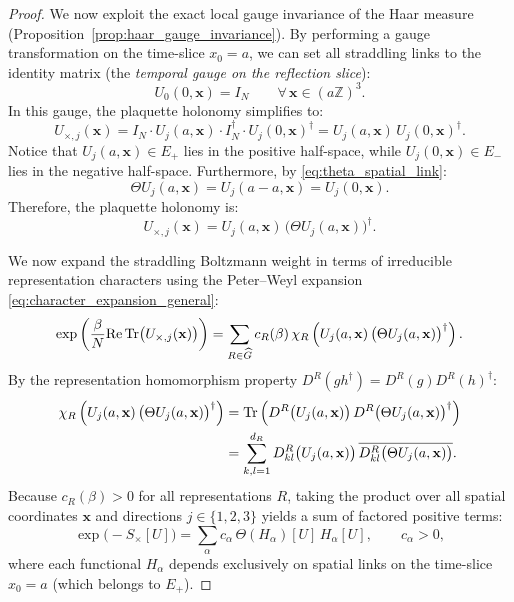 \begin{proof}
We now exploit the exact local gauge invariance of the Haar measure (Proposition~\ref{prop:haar_gauge_invariance}). By performing a gauge transformation on the time-slice $x_0 = a$, we can set all straddling links to the identity matrix (the \emph{temporal gauge on the reflection slice}):
\begin{equation}
U_0(0, \mathbf{x}) = I_N \qquad \forall \, \mathbf{x} \in (a \mathbb{Z})^3.
\end{equation}
In this gauge, the plaquette holonomy simplifies to:
\begin{equation}
U_{\times, j}(\mathbf{x}) = I_N \cdot U_j(a, \mathbf{x}) \cdot I_N^\dagger \cdot U_j(0, \mathbf{x})^\dagger = U_j(a, \mathbf{x}) \, U_j(0, \mathbf{x})^\dagger.
\end{equation}
Notice that $U_j(a, \mathbf{x}) \in E_+$ lies in the positive half-space, while $U_j(0, \mathbf{x}) \in E_-$ lies in the negative half-space. Furthermore, by \eqref{eq:theta_spatial_link}:
\begin{equation}
\Theta U_j(a, \mathbf{x}) = U_j(a - a, \mathbf{x}) = U_j(0, \mathbf{x}).
\end{equation}
Therefore, the plaquette holonomy is:
\begin{equation}
U_{\times, j}(\mathbf{x}) = U_j(a, \mathbf{x}) \, \bigl( \Theta U_j(a, \mathbf{x}) \bigr)^\dagger.
\end{equation}

We now expand the straddling Boltzmann weight in terms of irreducible representation characters using the Peter--Weyl expansion \eqref{eq:character_expansion_general}:
\begin{equation}
\exp\left( \frac{\beta}{N} \mathrm{Re} \, \mathrm{Tr}\bigl( U_{\times, j}(\mathbf{x}) \bigr) \right) = \sum_{R \in \widehat{G}} c_R(\beta) \, \chi_R\left( U_j(a, \mathbf{x}) \, \bigl( \Theta U_j(a, \mathbf{x}) \bigr)^\dagger \right).
\end{equation}
By the representation homomorphism property $D^R(g h^\dagger) = D^R(g) D^R(h)^\dagger$:
\begin{align}
\chi_R\left( U_j(a, \mathbf{x}) \, \bigl( \Theta U_j(a, \mathbf{x}) \bigr)^\dagger \right) &= \mathrm{Tr}\left( D^R\bigl( U_j(a, \mathbf{x}) \bigr) \, D^R\bigl( \Theta U_j(a, \mathbf{x}) \bigr)^\dagger \right) \nonumber \\
&= \sum_{k, l=1}^{d_R} D^R_{kl}\bigl( U_j(a, \mathbf{x}) \bigr) \, \overline{D^R_{kl}\bigl( \Theta U_j(a, \mathbf{x}) \bigr)}.
\end{align}
Because $c_R(\beta) > 0$ for all representations $R$, taking the product over all spatial coordinates $\mathbf{x}$ and directions $j \in \{1, 2, 3\}$ yields a sum of factored positive terms:
\begin{equation}
\exp\bigl( -S_\times[U] \bigr) = \sum_\alpha c_\alpha \, \Theta(H_\alpha)[U] \, H_\alpha[U], \qquad c_\alpha > 0,
\end{equation}
where each functional $H_\alpha$ depends exclusively on spatial links on the time-slice $x_0 = a$ (which belongs to $E_+$).


\end{proof}
